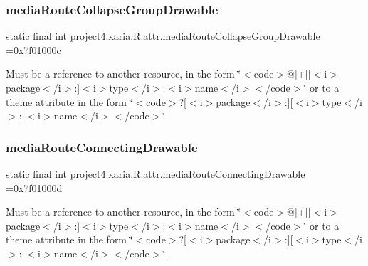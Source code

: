 \subsubsection{\texorpdfstring{media\+Route\+Collapse\+Group\+Drawable}{mediaRouteCollapseGroupDrawable}}
{\footnotesize\ttfamily static final int project4.\+xaria.\+R.\+attr.\+media\+Route\+Collapse\+Group\+Drawable =0x7f01000c\hspace{0.3cm}{\ttfamily [static]}}

Must be a reference to another resource, in the form \char`\"{}$<$code$>$@\mbox{[}+\mbox{]}\mbox{[}$<$i$>$package$<$/i$>$\+:\mbox{]}$<$i$>$type$<$/i$>$\+:$<$i$>$name$<$/i$>$$<$/code$>$\char`\"{} or to a theme attribute in the form \char`\"{}$<$code$>$?\mbox{[}$<$i$>$package$<$/i$>$\+:\mbox{]}\mbox{[}$<$i$>$type$<$/i$>$\+:\mbox{]}$<$i$>$name$<$/i$>$$<$/code$>$\char`\"{}. \mbox{\label{classproject4_1_1xaria_1_1R_1_1attr_a84d858b46985049420719c7443b37232}} 
\subsubsection{\texorpdfstring{media\+Route\+Connecting\+Drawable}{mediaRouteConnectingDrawable}}
{\footnotesize\ttfamily static final int project4.\+xaria.\+R.\+attr.\+media\+Route\+Connecting\+Drawable =0x7f01000d\hspace{0.3cm}{\ttfamily [static]}}

Must be a reference to another resource, in the form \char`\"{}$<$code$>$@\mbox{[}+\mbox{]}\mbox{[}$<$i$>$package$<$/i$>$\+:\mbox{]}$<$i$>$type$<$/i$>$\+:$<$i$>$name$<$/i$>$$<$/code$>$\char`\"{} or to a theme attribute in the form \char`\"{}$<$code$>$?\mbox{[}$<$i$>$package$<$/i$>$\+:\mbox{]}\mbox{[}$<$i$>$type$<$/i$>$\+:\mbox{]}$<$i$>$name$<$/i$>$$<$/code$>$\char`\"{}. \mbox{\label{classproject4_1_1xaria_1_1R_1_1attr_af44b48cfd859fcf3c41599b050a6fe0d}} 
